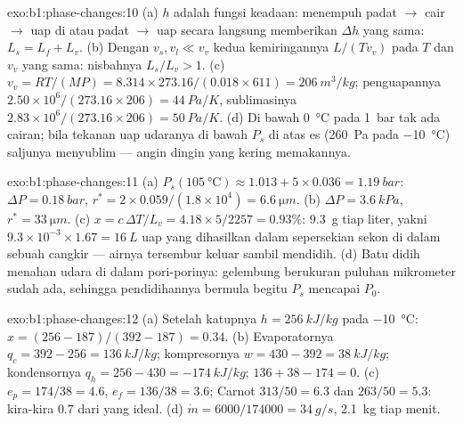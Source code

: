 \begin{solution}{exo:b1:phase-changes:10}
(a) $h$ adalah fungsi keadaan: menempuh padat $\to$ cair $\to$ uap di
 atau padat $\to$ uap secara langsung memberikan $\Delta h$ yang sama:
$L_s = L_f + L_v$. (b) Dengan $v_s, v_l \ll v_v$ kedua kemiringannya $L/(Tv_v)$ pada
$T$ dan $v_v$ yang sama: nisbahnya $L_s/L_v > 1$. (c) $v_v = RT/(MP) =
8.314 \times 273.16/(0.018 \times 611) = \qty{206}{m^3/kg}$; penguapannya
$2.50 \times 10^6/(273.16 \times 206) = \qty{44}{Pa/K}$, sublimasinya $2.83 \times 10^6/
(273.16 \times 206) = \qty{50}{Pa/K}$. (d) Di bawah \qty{0}{\degreeCelsius} pada
\qty{1}{bar} tak ada cairan; bila tekanan uap udaranya di bawah
$P_s$ di atas es (\qty{260}{Pa} pada \qty{-10}{\degreeCelsius}) saljunya
menyublim --- angin dingin yang kering memakannya.
\end{solution}

\begin{solution}{exo:b1:phase-changes:11}
(a) $P_s(\qty{105}{\degreeCelsius}) \approx 1.013 + 5 \times 0.036 = \qty{1.19}{bar}$:
$\Delta P = \qty{0.18}{bar}$, $r^\ast = 2 \times 0.059/(1.8 \times 10^4) = \qty{6.6}{\micro m}$.
(b) $\Delta P = \qty{3.6}{kPa}$, $r^\ast = \qty{33}{\micro m}$. (c) $x = c\,\Delta T/L_v =
4.18 \times 5/2257 = 0.93\%$: \qty{9.3}{g} tiap liter, yakni $9.3 \times 10^{-3}
\times 1.67 = \qty{16}{L}$ uap yang dihasilkan dalam sepersekian sekon di dalam
sebuah cangkir --- airnya tersembur keluar sambil mendidih. (d) Batu didih menahan udara di dalam
pori-porinya: gelembung berukuran puluhan mikrometer sudah ada, sehingga pendidihannya bermula
begitu $P_s$ mencapai $P_0$.
\end{solution}

\begin{solution}{exo:b1:phase-changes:12}
(a) Setelah katupnya $h = \qty{256}{kJ/kg}$ pada \qty{-10}{\degreeCelsius}: $x =
(256 - 187)/(392 - 187) = 0.34$. (b) Evaporatornya $q_c = 392 - 256 =
\qty{136}{kJ/kg}$; kompresornya $w = 430 - 392 = \qty{38}{kJ/kg}$; kondensornya
$q_h = 256 - 430 = \qty{-174}{kJ/kg}$; $136 + 38 - 174 = 0$. (c) $e_p =
174/38 = 4.6$, $e_f = 136/38 = 3.6$; Carnot $313/50 = 6.3$ dan $263/50 =
5.3$: kira-kira $0.7$ dari yang ideal. (d) $\dot m = 6000/174000 = \qty{34}{g/s}$,
\qty{2.1}{kg} tiap menit.
\end{solution}

